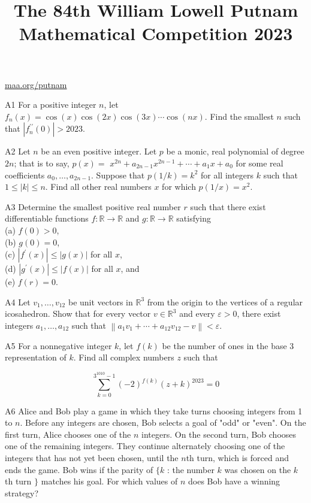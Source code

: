 \documentclass[10pt]{article}
\title{The 84th William Lowell Putnam Mathematical Competition 2023 }
\author{}
\date{}
\begin{document}
\maketitle
\href{http://maa.org/putnam}{maa.org/putnam}

A1 For a positive integer $n$, let $f_{n}(x)=\cos (x) \cos (2 x) \cos (3 x) \cdots \cos (n x)$. Find the smallest $n$ such that $\left|f_{n}^{\prime \prime}(0)\right|>2023$.

A2 Let $n$ be an even positive integer. Let $p$ be a monic, real polynomial of degree $2 n$; that is to say, $p(x)=$ $x^{2 n}+a_{2 n-1} x^{2 n-1}+\cdots+a_{1} x+a_{0}$ for some real coefficients $a_{0}, \ldots, a_{2 n-1}$. Suppose that $p(1 / k)=k^{2}$ for all integers $k$ such that $1 \leq|k| \leq n$. Find all other real numbers $x$ for which $p(1 / x)=x^{2}$.

A3 Determine the smallest positive real number $r$ such that there exist differentiable functions $f: \mathbb{R} \rightarrow \mathbb{R}$ and $g: \mathbb{R} \rightarrow \mathbb{R}$ satisfying\\
(a) $f(0)>0$,\\
(b) $g(0)=0$,\\
(c) $\left|f^{\prime}(x)\right| \leq|g(x)|$ for all $x$,\\
(d) $\left|g^{\prime}(x)\right| \leq|f(x)|$ for all $x$, and\\
(e) $f(r)=0$.

A4 Let $v_{1}, \ldots, v_{12}$ be unit vectors in $\mathbb{R}^{3}$ from the origin to the vertices of a regular icosahedron. Show that for every vector $v \in \mathbb{R}^{3}$ and every $\varepsilon>0$, there exist integers $a_{1}, \ldots, a_{12}$ such that $\left\|a_{1} v_{1}+\cdots+a_{12} v_{12}-v\right\|<\varepsilon$.

A5 For a nonnegative integer $k$, let $f(k)$ be the number of ones in the base 3 representation of $k$. Find all complex numbers $z$ such that

$$
\sum_{k=0}^{3^{1010}-1}(-2)^{f(k)}(z+k)^{2023}=0
$$

A6 Alice and Bob play a game in which they take turns choosing integers from 1 to $n$. Before any integers are chosen, Bob selects a goal of "odd" or "even". On the first turn, Alice chooses one of the $n$ integers. On the second turn, Bob chooses one of the remaining integers. They continue alternately choosing one of the integers that has not yet been chosen, until the $n$th turn, which is forced and ends the game. Bob wins if the parity of $\{k$ : the number $k$ was chosen on the $k$ th turn $\}$ matches his goal. For which values of $n$ does Bob have a winning strategy?
\end{document}
